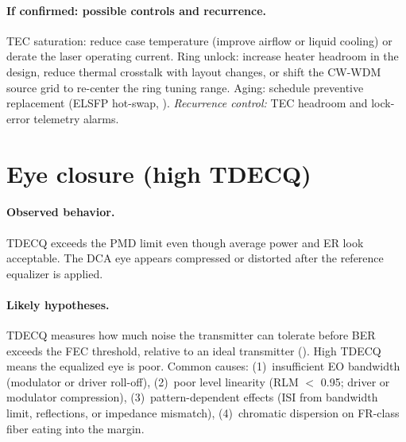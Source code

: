 \paragraph{If confirmed: possible controls and recurrence.}
TEC saturation: reduce case temperature (improve airflow or liquid cooling) or
derate the laser operating current. Ring unlock: increase heater headroom in the
design, reduce thermal crosstalk with layout changes, or shift the CW-WDM source
grid to re-center the ring tuning range. Aging: schedule preventive replacement
(ELSFP hot-swap, ).
\emph{Recurrence control:} TEC headroom and lock-error telemetry alarms.

\section{Eye closure (high TDECQ)}
\label{sec:fm-eye-closure}

\paragraph{Observed behavior.}
TDECQ exceeds the PMD limit even though average power and ER look acceptable. The
DCA eye appears compressed or distorted after the reference equalizer is applied.

\paragraph{Likely hypotheses.}
TDECQ measures how much noise the transmitter can tolerate before BER exceeds the
FEC threshold, relative to an ideal transmitter (). High TDECQ
means the equalized eye is poor. Common causes: (1)~insufficient EO bandwidth
(modulator or driver roll-off), (2)~poor level linearity (RLM $<$ 0.95;
driver or modulator compression), (3)~pattern-dependent effects (ISI from
bandwidth limit, reflections, or impedance mismatch), (4)~chromatic dispersion on
FR-class fiber eating into the margin.


